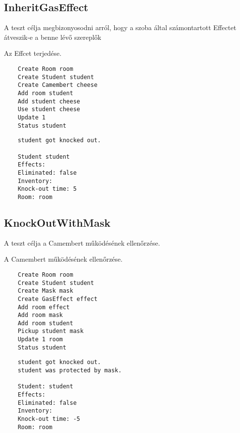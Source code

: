 \subsection{InheritGasEffect}
\begin{test-case-description}
    A teszt célja megbizonyosodni arról, hogy a szoba által számontartott Effectet
átveszik-e a benne lévő szereplők
\end{test-case-description}
\begin{test-case-function}
    Az Effcet terjedése.
\end{test-case-function}
\begin{test-case-input}
    \begin{verbatim}
    Create Room room
    Create Student student
    Create Camembert cheese
    Add room student
    Add student cheese
    Use student cheese
    Update 1
    Status student
    \end{verbatim}
\end{test-case-input}
\begin{test-case-output}
    \begin{verbatim}
    student got knocked out.
    
    Student student
    Effects:
    Eliminated: false
    Inventory: 
    Knock-out time: 5
    Room: room
    \end{verbatim}
\end{test-case-output}


\subsection{KnockOutWithMask}
\begin{test-case-description}
    A teszt célja a Camembert működésének ellenőrzése.
\end{test-case-description}
\begin{test-case-function}
    A Camembert működésének ellenőrzése.
\end{test-case-function}
\begin{test-case-input}
    \begin{verbatim}
    Create Room room
    Create Student student
    Create Mask mask
    Create GasEffect effect
    Add room effect
    Add room mask
    Add room student
    Pickup student mask
    Update 1 room
    Status student
    \end{verbatim}
\end{test-case-input}
\begin{test-case-output}
    \begin{verbatim}
    student got knocked out.
    student was protected by mask.
    
    Student: student
    Effects: 
    Eliminated: false
    Inventory: 
    Knock-out time: -5
    Room: room
    \end{verbatim}
\end{test-case-output}

